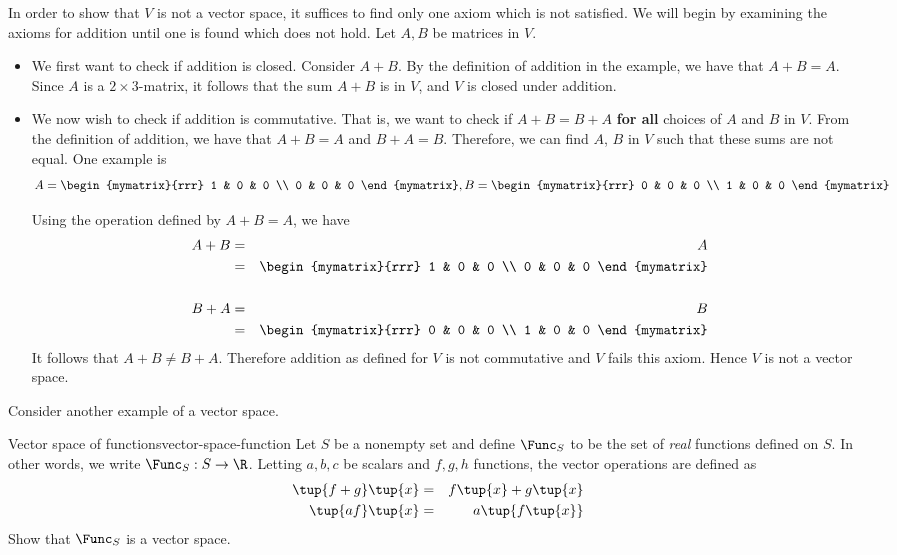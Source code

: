 \begin{solution}
In order to show that $V$ is not a vector space, it suffices to find only one axiom which is not satisfied. We will begin by examining the axioms for addition until one is found which does not hold. Let $A,B$ be matrices in $V$. 

\begin{itemize}
\item
We first want to check if addition is closed. Consider $A+B$. By the definition of addition in the example, we have that $A+B = A$. Since $A$ is a $2 \times 3$-matrix, it follows that the sum $A+B$ is in $V$, and $V$ is closed under addition. 

\item
We now wish to check if addition is commutative. That is, we want to check if $A + B = B + A$ \textbf{for all} choices of $A$ and $B$ in $V$. From the definition of addition, we have that $A + B = A$ and $B + A = B$. Therefore, we can find $A$, $B$ in $V$ such that these sums are not equal. One example is 
\[
A = \begin{mymatrix}{rrr}
1 & 0 & 0 \\
0 & 0 & 0 
\end{mymatrix}, B = \begin{mymatrix}{rrr}
0 & 0 & 0 \\
1 & 0 & 0 
\end{mymatrix}
\]

Using the operation defined by $A+B=A$, we have 
\begin{eqnarray*}
A+B &=& A \\
&=& \begin{mymatrix}{rrr}
1 & 0 & 0 \\
0 & 0 & 0 
\end{mymatrix} \\
\\
B+A &=& B \\
&=& \begin{mymatrix}{rrr}
0 & 0 & 0 \\
1 & 0 & 0 
\end{mymatrix}
\end{eqnarray*}
It follows that $A+B \neq B+A$. Therefore addition as defined for $V$ is not commutative and $V$ fails this axiom. Hence $V$ is not a vector space.
\end{itemize}
\end{solution}

Consider another example of a vector space. 

\begin{example}{Vector space of functions}{vector-space-function}
Let $S$ be a nonempty set and define $\Func_S$ to be the set of \textit{real} functions
defined on $S$. In other words, we write $\Func_S: S \to \R$. Letting $a,b,c$ be scalars and $f,g,h$ functions, the
vector operations are defined as
\begin{eqnarray*}
\tup{f+g} \tup{x}  &=&f\tup{x} +g\tup{
x}  \\
\tup{af} \tup{x}  &=&a\tup{f\tup{x} }
\end{eqnarray*}
Show that $\Func_S$ is a vector space. 
\end{example}

